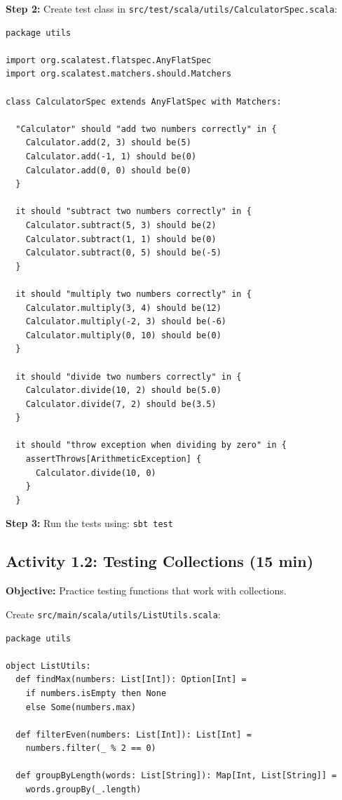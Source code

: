 \documentclass[12pt,a4paper]{article}
\begin{document}
\textbf{Step 2:} Create test class in \texttt{src/test/scala/utils/CalculatorSpec.scala}:

\begin{lstlisting}
package utils

import org.scalatest.flatspec.AnyFlatSpec
import org.scalatest.matchers.should.Matchers

class CalculatorSpec extends AnyFlatSpec with Matchers:
  
  "Calculator" should "add two numbers correctly" in {
    Calculator.add(2, 3) should be(5)
    Calculator.add(-1, 1) should be(0)
    Calculator.add(0, 0) should be(0)
  }
  
  it should "subtract two numbers correctly" in {
    Calculator.subtract(5, 3) should be(2)
    Calculator.subtract(1, 1) should be(0)
    Calculator.subtract(0, 5) should be(-5)
  }
  
  it should "multiply two numbers correctly" in {
    Calculator.multiply(3, 4) should be(12)
    Calculator.multiply(-2, 3) should be(-6)
    Calculator.multiply(0, 10) should be(0)
  }
  
  it should "divide two numbers correctly" in {
    Calculator.divide(10, 2) should be(5.0)
    Calculator.divide(7, 2) should be(3.5)
  }
  
  it should "throw exception when dividing by zero" in {
    assertThrows[ArithmeticException] {
      Calculator.divide(10, 0)
    }
  }
\end{lstlisting}

\textbf{Step 3:} Run the tests using: \texttt{sbt test}

\subsection{Activity 1.2: Testing Collections (15 min)}

\textbf{Objective:} Practice testing functions that work with collections.

Create \texttt{src/main/scala/utils/ListUtils.scala}:

\begin{lstlisting}
package utils

object ListUtils:
  def findMax(numbers: List[Int]): Option[Int] = 
    if numbers.isEmpty then None
    else Some(numbers.max)
  
  def filterEven(numbers: List[Int]): List[Int] = 
    numbers.filter(_ % 2 == 0)
  
  def groupByLength(words: List[String]): Map[Int, List[String]] = 
    words.groupBy(_.length)
\end{lstlisting}
\end{document}
